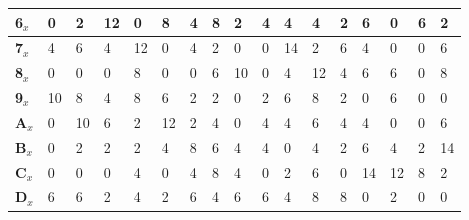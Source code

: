 \begin{longtable}[c]{|l|l|l|l|l|l|l|l|l|l|l|l|l|l|l|l|l|}
\textbf{6$_x$}  & 0              & 2              & 12             & 0              & 8              & 4              & 8              & 2              & 4              & 4              & 4              & 2              & 6              & 0              & 6              & 2              \\ \hline
\textbf{7$_x$}  & 4              & 6              & 4              & 12             & 0              & 4              & 2              & 0              & 0              & 14             & 2              & 6              & 4              & 0              & 0              & 6              \\ \hline
\textbf{8$_x$}  & 0              & 0              & 0              & 8              & 0              & 0              & 6              & 10             & 0              & 4              & 12             & 4              & 6              & 6              & 0              & 8              \\ \hline
\textbf{9$_x$}  & 10             & 8              & 4              & 8              & 6              & 2              & 2              & 0              & 2              & 6              & 8              & 2              & 0              & 6              & 0              & 0              \\ \hline
\textbf{A$_x$}  & 0              & 10             & 6              & 2              & 12             & 2              & 4              & 0              & 4              & 4              & 6              & 4              & 4              & 0              & 0              & 6              \\ \hline
\textbf{B$_x$}  & 0              & 2              & 2              & 2              & 4              & 8              & 6              & 4              & 4              & 0              & 4              & 2              & 6              & 4              & 2              & 14             \\ \hline
\textbf{C$_x$}  & 0              & 0              & 0              & 4              & 0              & 4              & 8              & 4              & 0              & 2              & 6              & 0              & 14             & 12             & 8              & 2              \\ \hline
\textbf{D$_x$}  & 6              & 6              & 2              & 4              & 2              & 6              & 4              & 6              & 6              & 4              & 8              & 8              & 0              & 2              & 0              & 0              \\ \hline

\end{longtable}
